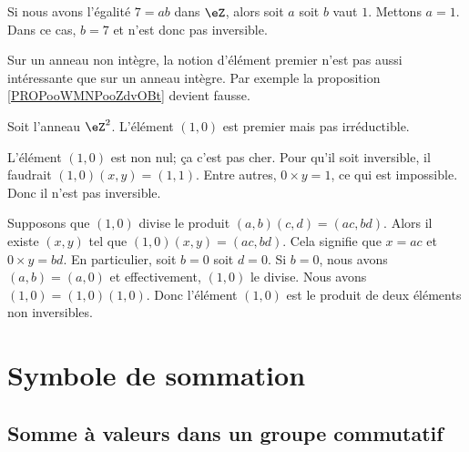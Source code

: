 \begin{example}
	Si nous avons l'égalité \( 7=ab\) dans \( \eZ\), alors soit \( a\) soit \( b\) vaut \( 1\). Mettons \( a=1\). Dans ce cas, \( b=7\) et n'est donc pas inversible.
\end{example}

Sur un anneau non intègre, la notion d'élément premier n'est pas aussi intéressante que sur un anneau intègre. Par exemple la proposition \ref{PROPooWMNPooZdvOBt} devient fausse.

\begin{example}     \label{EXooEIUEooCZCPMC}
	Soit l'anneau \( \eZ^2\). L'élément \( (1,0)\) est premier mais pas irréductible.
	\begin{subproof}
		L'élément \( (1,0)\) est non nul; ça c'est pas cher. Pour qu'il soit inversible, il faudrait \( (1,0)(x,y)=(1,1)\). Entre autres, \( 0\times y=1\), ce qui est impossible. Donc il n'est pas inversible.

		Supposons que \( (1,0)\) divise le produit \( (a,b)(c,d)=(ac,bd)\). Alors il existe \( (x,y)\) tel que \( (1,0)(x,y)=(ac,bd)\). Cela signifie que \( x=ac\) et \( 0\times y=bd\). En particulier, soit \( b=0\) soit \( d=0\). Si \( b=0\), nous avons \( (a,b)=(a,0)\) et effectivement, \( (1,0)\) le divise.
		Nous avons \( (1,0)=(1,0)(1,0)\). Donc l'élément \( (1,0)\) est le produit de deux éléments non inversibles.
	\end{subproof}
\end{example}

\section{Symbole de sommation}

\subsection{Somme à valeurs dans un groupe commutatif}

